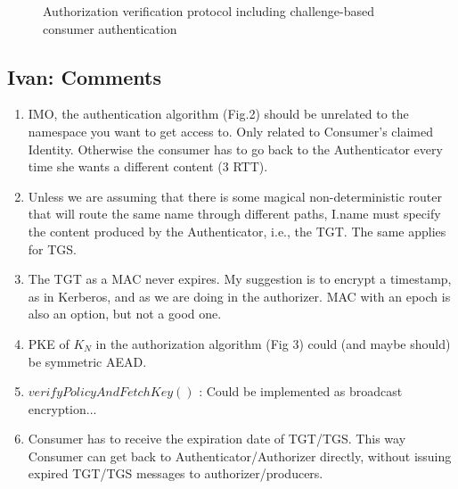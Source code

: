 \documentclass[conference]{IEEEtran}
\begin{document}
\begin{figure}
\begin{center}
\caption{Authorization verification protocol including challenge-based consumer authentication}
\label{fig:spectr-basic}
\end{center}
\end{figure}


\subsection{Ivan: Comments}
\begin{enumerate}
 \item IMO, the authentication algorithm (Fig.2) should be unrelated to the namespace you want to get access to. Only related to Consumer's claimed Identity. Otherwise the consumer has to go back to the Authenticator every time she wants a different content (3 RTT).
 \item Unless we are assuming that there is some magical non-deterministic router that will route the same name through different paths, I.name must specify the content produced by the Authenticator, i.e., the TGT. The same applies for TGS.
 \item The TGT as a MAC never expires. My suggestion is to encrypt a timestamp, as in Kerberos, and as we are doing in the authorizer. MAC with an epoch is also an option, but not a good one.
 \item PKE of $K_N$ in the authorization algorithm (Fig 3) could (and maybe should) be symmetric AEAD.
 \item $verifyPolicyAndFetchKey()$ : Could be implemented as broadcast encryption...
 \item Consumer has to receive the expiration date of TGT/TGS. This way Consumer can get back to Authenticator/Authorizer directly, without issuing expired TGT/TGS messages to authorizer/producers.
\end{enumerate}
\end{document}

